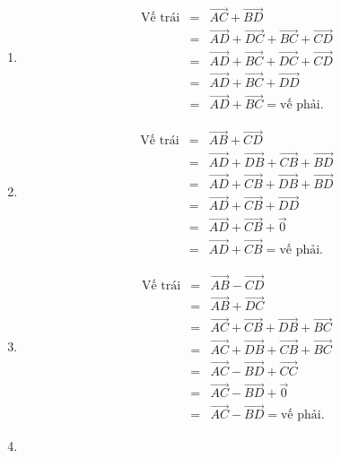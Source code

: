 \begin{bt}
{\begin{enumerate}
\begin{eqnarray*}
				&=&\overrightarrow{AF}=\text{vế phải}.
			\end{eqnarray*}
			\item \begin{eqnarray*}
				\text{Vế trái}
				&=&\overrightarrow{AC}+\overrightarrow{BD}\\
				&=&\overrightarrow{AD}+\overrightarrow{DC}+\overrightarrow{BC}+\overrightarrow{CD}\\
				&=&\overrightarrow{AD}+\overrightarrow{BC}+\overrightarrow{DC}+\overrightarrow{CD}\\
				&=&\overrightarrow{AD}+\overrightarrow{BC}+\overrightarrow{DD}\\
				&=&\overrightarrow{AD}+\overrightarrow{BC}=\text{vế phải}.
			\end{eqnarray*}
			\item \begin{eqnarray*}
				\text{Vế trái}
				&=&\overrightarrow{AB}+\overrightarrow{CD}\\
				&=&\overrightarrow{AD}+\overrightarrow{DB}+\overrightarrow{CB}+\overrightarrow{BD}\\
				&=&\overrightarrow{AD}+\overrightarrow{CB}+\overrightarrow{DB}+\overrightarrow{BD}\\
				&=&\overrightarrow{AD}+\overrightarrow{CB}+\overrightarrow{DD}\\
				&=&\overrightarrow{AD}+\overrightarrow{CB}+\overrightarrow{0}\\
				&=&\overrightarrow{AD}+\overrightarrow{CB}=\text{vế phải}.
			\end{eqnarray*}
			\item \begin{eqnarray*}
				\text{Vế trái}
				&=&\overrightarrow{AB}-\overrightarrow{CD}\\
				&=&\overrightarrow{AB}+\overrightarrow{DC}\\
				&=&\overrightarrow{AC}+\overrightarrow{CB}+\overrightarrow{DB}+\overrightarrow{BC}\\
				&=&\overrightarrow{AC}+\overrightarrow{DB}+\overrightarrow{CB}+\overrightarrow{BC}\\
				&=&\overrightarrow{AC}-\overrightarrow{BD}+\overrightarrow{CC}\\
				&=&\overrightarrow{AC}-\overrightarrow{BD}+\overrightarrow{0}\\
				&=&\overrightarrow{AC}-\overrightarrow{BD}=\text{vế phải}.
			\end{eqnarray*}
			\item \begin{eqnarray*}

\end{eqnarray*}
\end{enumerate}}
\end{bt}
